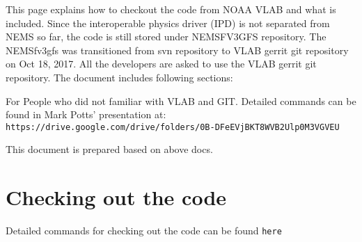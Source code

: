 This page explains how to checkout the code from N\+O\+AA V\+L\+AB and what is included. Since the interoperable physics driver (I\+PD) is not separated from N\+E\+MS so far, the code is still stored under N\+E\+M\+S\+F\+V3\+G\+FS repository. The N\+E\+M\+Sfv3gfs was transitioned from svn repository to V\+L\+AB gerrit git repository on Oct 18, 2017. All the developers are asked to use the V\+L\+AB gerrit git repository. The document includes following sections\+:

For People who did not familiar with V\+L\+AB and G\+IT. Detailed commands can be found in Mark Potts’ presentation at\+: {\tt https\+://drive.\+google.\+com/drive/folders/0\+B-\/\+D\+Fe\+E\+Vj\+B\+K\+T8\+W\+V\+B2\+Ulp0\+M3\+V\+G\+V\+EU}

This document is prepared based on above docs.\section{Checking out the code}\label{code_checkout}
Detailed commands for checking out the code can be found {\tt here } 